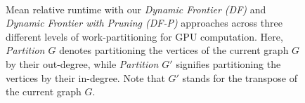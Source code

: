 \begin{figure}[!hbt]
  \centering
   \\[-2ex]
  \caption{Mean relative runtime with our \textit{Dynamic Frontier (DF)} and \textit{Dynamic Frontier with Pruning (DF-P)} approaches across three different levels of work-partitioning for GPU computation. Here, \textit{Partition $G$} denotes partitioning the vertices of the current graph $G$ by their out-degree, while \textit{Partition $G'$} signifies partitioning the vertices by their in-degree. Note that $G'$ stands for the transpose of the current graph $G$.}
  \label{fig:adjust-partition}
\end{figure}
